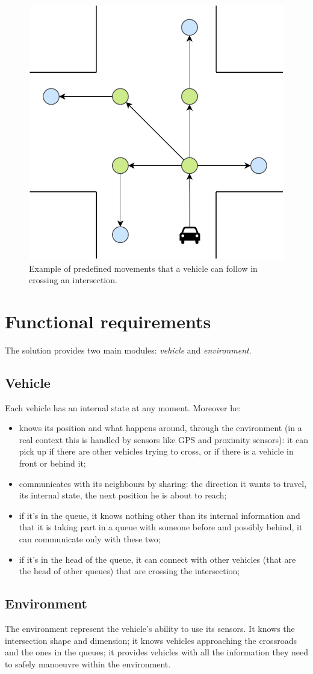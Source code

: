\documentclass{memoir}
\begin{document}
\begin{figure}
	\centering
	\includegraphics[width=0.4\linewidth]{intersection_graph.pdf}
	\caption{Example of predefined movements that a vehicle can follow in crossing an intersection.}
	\label{fig:intersection-graph}
\end{figure}

\section{Functional requirements}
The solution provides two main modules: \emph{vehicle} and \emph{environment}.

\subsection{Vehicle}
Each vehicle has an internal state at any moment. Moreover he:

\begin{itemize}
	\item knows its position and what happens around, through the environment (in a real context this is handled by sensors like GPS and proximity sensors): it can pick up if there are other vehicles trying to cross, or if there is a vehicle in front or behind it;
	\item communicates with its neighbours by sharing: the direction it wants to travel, its internal state, the next position he is about to reach;
	\item if it's in the queue, it knows nothing other than its internal information and that it is taking part in a queue with someone before and possibly behind, it can communicate only with these two;
	\item if it's in the head of the queue, it can connect with other vehicles (that are the head of other queues) that are crossing the intersection;
\end{itemize}

\subsection{Environment}
The environment represent the vehicle's ability to use its sensors. It knows the intersection shape and dimension; it knows vehicles approaching the crossroads and the ones in the queues; it provides vehicles with all the information they need to safely manoeuvre within the environment.
\end{document}
